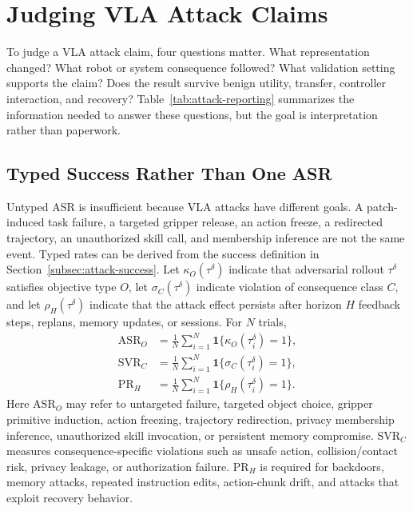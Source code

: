 \section{Judging VLA Attack Claims}
\label{sec:evaluation-principles}

To judge a VLA attack claim, four questions matter. What representation changed? What robot or system consequence followed? What validation setting supports the claim? Does the result survive benign utility, transfer, controller interaction, and recovery? Table~\ref{tab:attack-reporting} summarizes the information needed to answer these questions, but the goal is interpretation rather than paperwork.



\subsection{Typed Success Rather Than One ASR}

Untyped ASR is insufficient because VLA attacks have different goals. A patch-induced task failure, a targeted gripper release, an action freeze, a redirected trajectory, an unauthorized skill call, and membership inference are not the same event. Typed rates can be derived from the success definition in Section~\ref{subsec:attack-success}. Let $\kappa_O(\tau^\delta)$ indicate that adversarial rollout $\tau^\delta$ satisfies objective type $O$, let $\sigma_C(\tau^\delta)$ indicate violation of consequence class $C$, and let $\rho_H(\tau^\delta)$ indicate that the attack effect persists after horizon $H$ feedback steps, replans, memory updates, or sessions. For $N$ trials,
\begin{align}
    \mathrm{ASR}_{O} &= \frac{1}{N}\sum_{i=1}^{N}\mathbf{1}\{\kappa_O(\tau_i^\delta)=1\}, \nonumber\\
    \mathrm{SVR}_{C} &= \frac{1}{N}\sum_{i=1}^{N}\mathbf{1}\{\sigma_C(\tau_i^\delta)=1\}, \nonumber\\
    \mathrm{PR}_{H} &= \frac{1}{N}\sum_{i=1}^{N}\mathbf{1}\{\rho_H(\tau_i^\delta)=1\}.
    \label{eq:typed-metrics}
\end{align}
Here $\mathrm{ASR}_{O}$ may refer to untargeted failure, targeted object choice, gripper primitive induction, action freezing, trajectory redirection, privacy membership inference, unauthorized skill invocation, or persistent memory compromise. $\mathrm{SVR}_{C}$ measures consequence-specific violations such as unsafe action, collision/contact risk, privacy leakage, or authorization failure. $\mathrm{PR}_{H}$ is required for backdoors, memory attacks, repeated instruction edits, action-chunk drift, and attacks that exploit recovery behavior.


